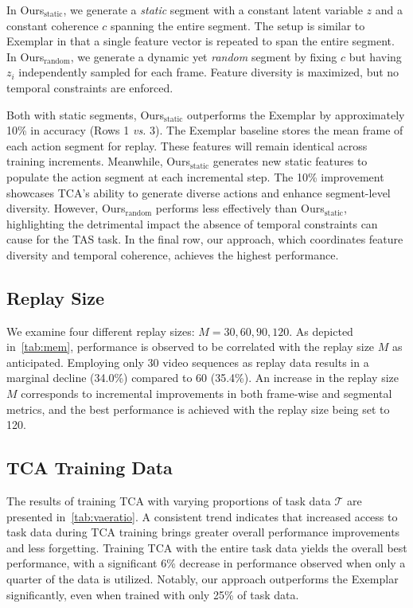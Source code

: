 In Ours$_\text{static}$, we generate a \textit{static} segment with a constant latent variable $z$ and a constant coherence $c$ spanning the entire segment. The setup is similar to Exemplar in that a single feature vector is repeated to span the entire segment. In Ours$_\text{random}$, we generate a dynamic yet \textit{random} segment by fixing $c$ but having $z_i$ independently sampled for each frame. Feature diversity is maximized, but no temporal constraints are enforced.

Both with static segments, Ours$_\text{static}$ outperforms the Exemplar by approximately 10\% in accuracy (Rows 1 \textit{vs.} 3). The Exemplar baseline stores the mean frame of each action segment for replay. These features will remain identical across training increments. Meanwhile, Ours$_\text{static}$ generates new static features to populate the action segment at each incremental step. The 10\% improvement showcases TCA's ability to generate diverse actions and enhance segment-level diversity. However, Ours$_\text{random}$ performs less effectively than Ours$_\text{static}$, highlighting the detrimental impact the absence of temporal constraints can cause for the TAS task. In the final row, our approach, which coordinates feature diversity and temporal coherence, achieves the highest performance.

\subsection{Replay Size}
\label{sec:abs_replay_size}



We examine four different replay sizes: $M=30,60,90,120$. As depicted in~\cref{tab:mem}, performance is observed to be correlated with the replay size $M$ as anticipated. Employing only 30 video sequences as replay data results in a marginal decline (34.0\%) compared to 60 (35.4\%). An increase in the replay size $M$ corresponds to incremental improvements in both frame-wise and segmental metrics, and the best performance is achieved with the replay size being set to 120.

\subsection{TCA Training Data}



The results of training TCA with varying proportions of task data  $\mathcal{T}$ are presented in~\cref{tab:vaeratio}. A consistent trend indicates that increased access to task data during TCA training brings greater overall performance improvements and less forgetting. Training TCA with the entire task data yields the overall best performance, with a significant 6\% decrease in performance observed when only a quarter of the data is utilized. Notably, our approach outperforms the Exemplar significantly, even when trained with only 25\% of task data. 

